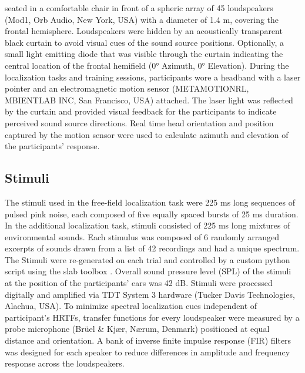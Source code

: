 seated in a comfortable chair in front of a spheric array of 45 loudspeakers (Mod1, Orb Audio, New York, USA) with a diameter of 1.4 m, covering the frontal hemisphere. Loudspeakers were hidden by an acoustically transparent black curtain to avoid visual cues of the sound source positions. Optionally, a small light emitting diode that was visible through the curtain indicating the central location of the frontal hemifield (0° Azimuth, 0° Elevation). During the localization tasks and training sessions, participants wore a headband with a laser pointer and an electromagnetic motion sensor (METAMOTIONRL, MBIENTLAB INC, San Francisco, USA) attached. The laser light was reflected by the curtain and provided visual feedback for the participants to indicate perceived sound source directions. Real time head orientation and position captured by the motion sensor were used to calculate azimuth and elevation of the participants’ response.

\subsection{Stimuli}
The stimuli used in the free-field localization task were 225 ms long sequences of pulsed pink noise, each composed of five equally spaced bursts of 25 ms duration. In the additional localization task, stimuli consisted of 225 ms long mixtures of environmental sounds. Each stimulus was composed of 6 randomly arranged excerpts of sounds drawn from a list of 42 recordings and had a unique spectrum. The Stimuli were re-generated on each trial and controlled by a custom python script using the slab toolbox \citep{schonwiesner_soundlab_2021}. Overall sound pressure level (SPL) of the stimuli at the position of the participants’ ears was 42 dB. Stimuli were processed digitally and amplified via TDT System 3 hardware (Tucker Davis Technologies, Alachua, USA). To minimize spectral localization cues independent of participant’s HRTFs, transfer functions for every loudspeaker  were measured by a probe microphone (Brüel \& Kjær, Nærum, Denmark) positioned at equal distance and orientation. A bank of inverse finite impulse response (FIR) filters was designed for each speaker to reduce differences in amplitude and frequency response across the loudspeakers. 

